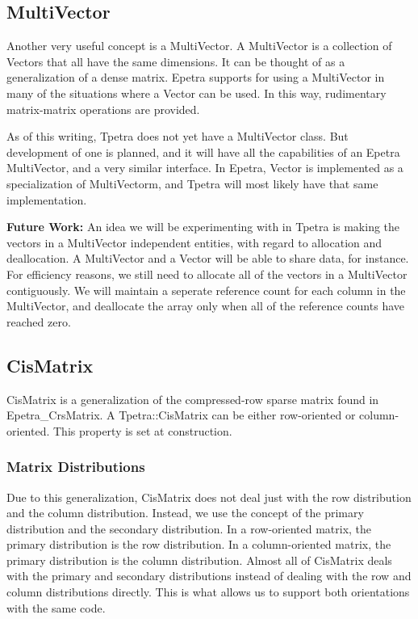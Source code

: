 \documentclass[10pt,relax]{TpetraDesign}
\begin{document}
%
\subsection{MultiVector}

Another very useful concept is a MultiVector. A MultiVector is a collection of Vectors that all have the same dimensions. It can be thought of as a generalization of a dense matrix. Epetra supports for using a MultiVector in many of the situations where a Vector can be used. In this way, rudimentary matrix-matrix operations are provided.

As of this writing, Tpetra does not yet have a MultiVector class. But development of one is planned, and it will have all the capabilities of an Epetra MultiVector, and a very similar interface. In Epetra, Vector is implemented as a specialization of MultiVectorm, and Tpetra will most likely have that same implementation.

\textbf{Future Work:} An idea we will be experimenting with in Tpetra is making the vectors in a MultiVector independent entities, with regard to allocation and deallocation. A MultiVector and a Vector will be able to share data, for instance. For efficiency reasons, we still need to allocate all of the vectors in a MultiVector contiguously. We will maintain a seperate reference count for each column in the MultiVector, and deallocate the array only when all of the reference counts have reached zero.

%
\subsection{CisMatrix}
CisMatrix is a generalization of the compressed-row sparse matrix found in Epetra\_CrsMatrix. A Tpetra::CisMatrix can be either row-oriented or column-oriented. This property is set at construction. 

\subsubsection*{Matrix Distributions}
Due to this generalization, CisMatrix does not deal just with the row distribution and the column distribution. Instead, we use the concept of the primary distribution and the secondary distribution. In a row-oriented matrix, the primary distribution is the row distribution. In a column-oriented matrix, the primary distribution is the column distribution. Almost all of CisMatrix deals with the primary and secondary distributions instead of dealing with the row and column  distributions directly. This is what allows us to support both orientations with the same code.
\end{document}
